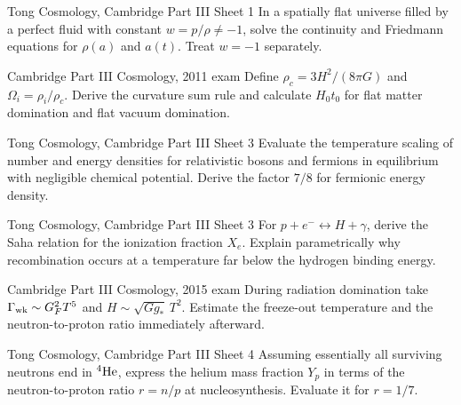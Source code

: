 \begin{exercises}

\begin{exercise}{Tong Cosmology, Cambridge Part III Sheet 1}
In a spatially flat universe filled by a perfect fluid with constant
\(w=p/\rho\neq-1\), solve the continuity and Friedmann equations for
\(\rho(a)\) and \(a(t)\).  Treat \(w=-1\) separately.
\end{exercise}

\begin{exercise}{Cambridge Part III Cosmology, 2011 exam}
Define \(\rho_c=3H^2/(8\pi G)\) and
\(\Omega_i=\rho_i/\rho_c\).  Derive the curvature sum rule and calculate
\(H_0t_0\) for flat matter domination and flat vacuum domination.
\end{exercise}

\begin{exercise}{Tong Cosmology, Cambridge Part III Sheet 3}
Evaluate the temperature scaling of number and energy densities for
relativistic bosons and fermions in equilibrium with negligible chemical
potential.  Derive the factor \(7/8\) for fermionic energy density.
\end{exercise}

\begin{exercise}{Tong Cosmology, Cambridge Part III Sheet 3}
For \(p+e^-\leftrightarrow H+\gamma\), derive the Saha relation for the
ionization fraction \(X_e\).  Explain parametrically why recombination occurs
at a temperature far below the hydrogen binding energy.
\end{exercise}

\begin{exercise}{Cambridge Part III Cosmology, 2015 exam}
During radiation domination take
\(\Gamma_{\rm wk}\sim G_F^2T^5\) and
\(H\sim\sqrt{Gg_\ast}\,T^2\).  Estimate the freeze-out temperature and the
neutron-to-proton ratio immediately afterward.
\end{exercise}

\begin{exercise}{Tong Cosmology, Cambridge Part III Sheet 4}
Assuming essentially all surviving neutrons end in \({}^4{\rm He}\), express
the helium mass fraction \(Y_p\) in terms of the neutron-to-proton ratio
\(r=n/p\) at nucleosynthesis.  Evaluate it for \(r=1/7\).
\end{exercise}


\end{exercises}
